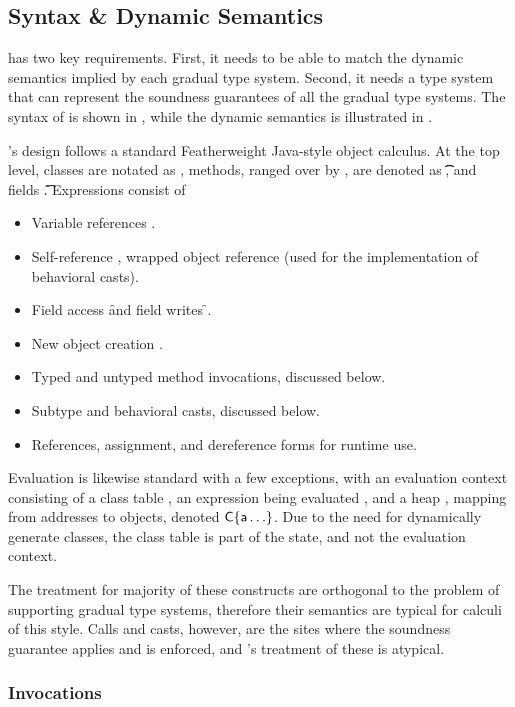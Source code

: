 \documentclass[a4paper,USenglish]{tex/lipics-v2016}
\begin{document}
\subsection{Syntax \& Dynamic Semantics}

\kafka has two key requirements. First, it needs to be able to match the
dynamic semantics implied by each gradual type system. Second, it needs a
type system that can represent the soundness guarantees of all the gradual type systems. 
The syntax of \kafka is shown in , while the
dynamic semantics is illustrated in .

\kafka's design follows a standard Featherweight Java-style object calculus.
At the top level, classes are notated as \Class{},
methods, ranged over by \md, are denoted as \Mdef\m\x\t\t\e, and fields
\Fdef\f\t. Expressions consist of

\begin{itemize}
\item Variable references \x.
\item Self-reference \this, wrapped object reference \that (used for the implementation of behavioral casts).
\item Field access \FRead\f and field writes \FWrite\f\e.
\item New object creation \New{}.
\item Typed and untyped method invocations, discussed below.
\item Subtype and behavioral casts, discussed below.
\item References, assignment, and dereference forms for runtime use.
\end{itemize}

Evaluation is likewise standard with a few exceptions, with an evaluation
context consisting of a class table \K, an expression being evaluated \e, and
a heap \s, mapping from addresses \a to objects, denoted $\C\{\a\ldots\}$. Due
to the need for dynamically generate classes, the class table \K is part of
the state, and not the evaluation context.

The treatment for majority of these constructs are orthogonal to the problem of supporting
gradual type systems, therefore their semantics are typical for calculi of this style. 
Calls and casts, however, are the sites where the soundness guarantee applies and is enforced, and
\kafka's treatment of these is atypical.

\subsubsection{Invocations}
\end{document}
